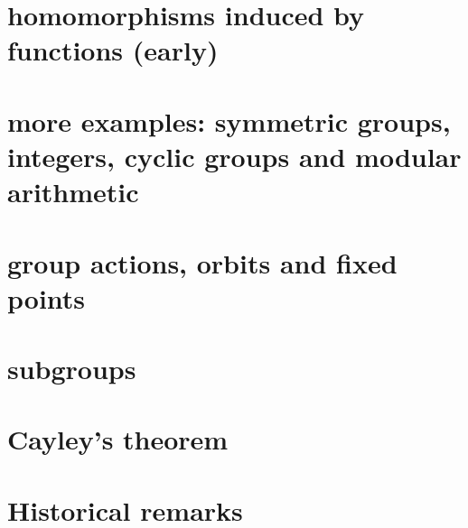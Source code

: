 \section{homomorphisms induced by functions (early)}
\section{more examples: symmetric groups, integers, cyclic groups and modular arithmetic}
\section{group actions, orbits and fixed points}
\section{subgroups}
\section{Cayley's theorem}
\section{Historical remarks}
\label{sec:grouphistory}



